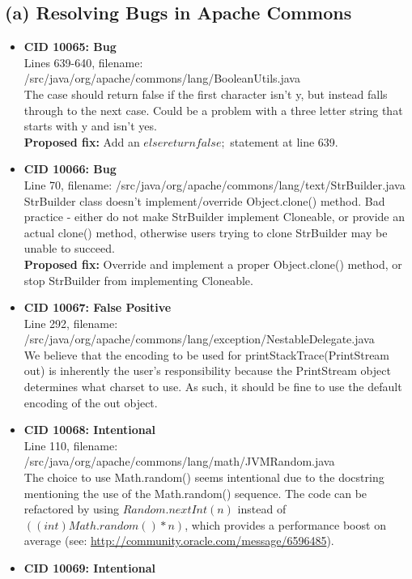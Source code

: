 \documentclass{article}
\begin{document}
\subsection*{(a) Resolving Bugs in Apache Commons}
\begin{itemize}
\item \textbf{CID 10065: Bug} \\
    Lines 639-640, filename: /src/java/org/apache/commons/lang/BooleanUtils.java \\
    The case should return false if the first character isn't y, but instead falls through to the next case.
    Could be a problem with a three letter string that starts with y and isn't yes. \\
    \textbf{Proposed fix:} Add an $else { return false; }$ statement at line 639.
\item \textbf{CID 10066: Bug} \\
    Line 70, filename: /src/java/org/apache/commons/lang/text/StrBuilder.java \\
    StrBuilder class doesn't implement/override Object.clone() method. Bad practice - either do not make
    StrBuilder implement Cloneable, or provide an actual clone() method, otherwise users trying to clone
    StrBuilder may be unable to succeed. \\
    \textbf{Proposed fix:} Override and implement a proper Object.clone() method, or stop StrBuilder from 
    implementing Cloneable.
\item \textbf{CID 10067: False Positive} \\
    Line 292, filename: /src/java/org/apache/commons/lang/exception/NestableDelegate.java \\
    We believe that the encoding to be used for printStackTrace(PrintStream out) is inherently the user's responsibility because
    the PrintStream object determines what charset to use. As such, it should be fine to use the default encoding of the out object.
\item \textbf{CID 10068: Intentional} \\
    Line 110, filename: /src/java/org/apache/commons/lang/math/JVMRandom.java \\
    The choice to use Math.random() seems intentional due to the docstring mentioning the use of the Math.random() sequence.
    The code can be refactored by using $Random.nextInt(n)$ instead of $((int)Math.random() * n)$, which provides a performance
    boost on average (see: \url{http://community.oracle.com/message/6596485}).
\item \textbf{CID 10069: Intentional} \\

\end{itemize}
\end{document}
